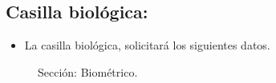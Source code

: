 \documentclass[a4paper,oneside,11pt]{book}
\begin{document}
\begin{itemize}
\begin{enumerate}
\end{enumerate}


\subsection{Casilla biológica:} 
\begin{itemize}
\item [] La casilla biológica, solicitará los siguientes datos. 
\end{itemize}

\begin{figure} [!h]
\begin{center}
\caption{Sección: Biométrico.}
\end{center}
\end{figure}



\end{itemize}
\end{document}
